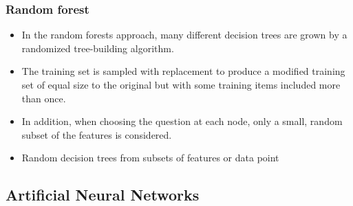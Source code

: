 \documentclass[aspectratio=169]{beamer}
\begin{document}

\begin{frame}
  \frametitle{Random forest}
  \begin{block}{}
    \begin{center}
      \begin{itemize}
      \item In the random forests approach, many different decision trees
        are grown by a randomized tree-building algorithm.
      \item The training set is sampled with replacement to produce a
        modified training set of equal size to the original but with some
        training items included more than once.
      \item In addition, when choosing the question at each node, only a
        small, random subset of the features is considered.
      \item Random decision trees from subsets of features or data point
      \end{itemize}
    \end{center}
  \end{block}
\end{frame}

\subsection{Artificial Neural Networks}

\setcounter{tocdepth}{2}
\begin{frame}{}
   \tableofcontents[currentsubsection]
\end{frame}
\end{document}
